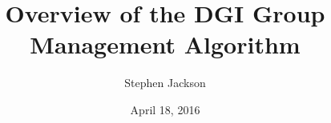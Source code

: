 \documentclass[12pt,oneside]{article}
\begin{document}
\title{Overview of the DGI Group Management Algorithm}
\author{Stephen Jackson}
\date{April 18, 2016}
\maketitle






\end{document}
